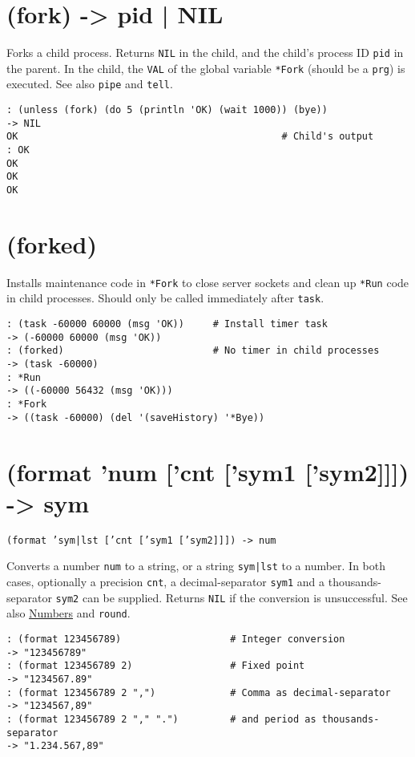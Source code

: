 {{{{{{ 
\section{(fork) -> pid | NIL}
\label{sec-8-1-6-21}


Forks a child process. Returns \texttt{NIL} in the child, and the child's
process ID \texttt{pid} in the parent. In the child, the \texttt{VAL} of the global
variable \texttt{*Fork} (should be a \texttt{prg}) is executed. See also \texttt{pipe} and
\texttt{tell}.


\begin{verbatim}
: (unless (fork) (do 5 (println 'OK) (wait 1000)) (bye))
-> NIL
OK                                              # Child's output
: OK
OK
OK
OK
\end{verbatim}

 
\section{(forked)}
\label{sec-8-1-6-22}


Installs maintenance code in \texttt{*Fork} to close server sockets and clean
up \texttt{*Run} code in child processes. Should only be called immediately
after \texttt{task}.


\begin{verbatim}
: (task -60000 60000 (msg 'OK))     # Install timer task
-> (-60000 60000 (msg 'OK))
: (forked)                          # No timer in child processes
-> (task -60000)
: *Run
-> ((-60000 56432 (msg 'OK)))
: *Fork
-> ((task -60000) (del '(saveHistory) '*Bye))
\end{verbatim}

 
\section{(format 'num ['cnt ['sym1 ['sym2]]]) -> sym}
\label{sec-8-1-6-23}


\texttt{(format 'sym|lst ['cnt ['sym1 ['sym2]]]) -> num}

Converts a number \texttt{num} to a string, or a string \texttt{sym|lst} to a number.
In both cases, optionally a precision \texttt{cnt}, a decimal-separator \texttt{sym1}
and a thousands-separator \texttt{sym2} can be supplied. Returns \texttt{NIL} if the
conversion is unsuccessful. See also \hyperref[ref.html-num-io]{Numbers} and
\texttt{round}.


\begin{verbatim}
: (format 123456789)                   # Integer conversion
-> "123456789"
: (format 123456789 2)                 # Fixed point
-> "1234567.89"
: (format 123456789 2 ",")             # Comma as decimal-separator
-> "1234567,89"
: (format 123456789 2 "," ".")         # and period as thousands-separator
-> "1.234.567,89"


\end{verbatim}}}}}}}
